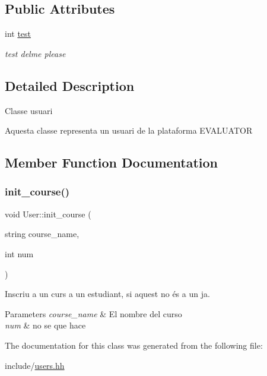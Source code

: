 \subsection*{Public Attributes}
\begin{DoxyCompactItemize}
\item 
\mbox{\label{classUser_a3b1ad720225a20b0a0219e07255336a4}} 
int \hyperlink{classUser_a3b1ad720225a20b0a0219e07255336a4}{test}
\begin{DoxyCompactList}\small\item\em test delme please \end{DoxyCompactList}\end{DoxyCompactItemize}


\subsection{Detailed Description}
Classe usuari

Aquesta classe representa un usuari de la plataforma E\+V\+A\+L\+U\+A\+T\+OR 

\subsection{Member Function Documentation}
\mbox{\label{classUser_a0957a99d28d9485ff02889c4ab91996c}} 
\subsubsection{\texorpdfstring{init\+\_\+course()}{init\_course()}}
{\footnotesize\ttfamily void User\+::init\+\_\+course (\begin{DoxyParamCaption}\item[{string}]{course\+\_\+name,  }\item[{int}]{num }\end{DoxyParamCaption})}

Inscriu a un curs a un estudiant, si aquest no és a un ja. 
\begin{DoxyParams}{Parameters}
{\em course\+\_\+name} & El nombre del curso \\
\hline
{\em num} & no se que hace \\
\hline
\end{DoxyParams}


The documentation for this class was generated from the following file\+:\begin{DoxyCompactItemize}
\item 
include/\hyperlink{users_8hh}{users.\+hh}\end{DoxyCompactItemize}
